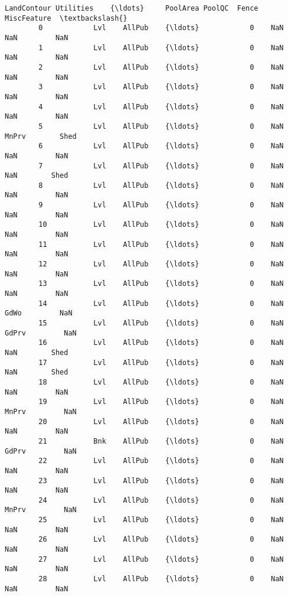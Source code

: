 \documentclass[11pt]{article}
\begin{document}
\begin{Verbatim}[commandchars=\\\{\}]
             LandContour Utilities    {\ldots}     PoolArea PoolQC  Fence MiscFeature  \textbackslash{}
        0            Lvl    AllPub    {\ldots}            0    NaN    NaN         NaN   
        1            Lvl    AllPub    {\ldots}            0    NaN    NaN         NaN   
        2            Lvl    AllPub    {\ldots}            0    NaN    NaN         NaN   
        3            Lvl    AllPub    {\ldots}            0    NaN    NaN         NaN   
        4            Lvl    AllPub    {\ldots}            0    NaN    NaN         NaN   
        5            Lvl    AllPub    {\ldots}            0    NaN  MnPrv        Shed   
        6            Lvl    AllPub    {\ldots}            0    NaN    NaN         NaN   
        7            Lvl    AllPub    {\ldots}            0    NaN    NaN        Shed   
        8            Lvl    AllPub    {\ldots}            0    NaN    NaN         NaN   
        9            Lvl    AllPub    {\ldots}            0    NaN    NaN         NaN   
        10           Lvl    AllPub    {\ldots}            0    NaN    NaN         NaN   
        11           Lvl    AllPub    {\ldots}            0    NaN    NaN         NaN   
        12           Lvl    AllPub    {\ldots}            0    NaN    NaN         NaN   
        13           Lvl    AllPub    {\ldots}            0    NaN    NaN         NaN   
        14           Lvl    AllPub    {\ldots}            0    NaN   GdWo         NaN   
        15           Lvl    AllPub    {\ldots}            0    NaN  GdPrv         NaN   
        16           Lvl    AllPub    {\ldots}            0    NaN    NaN        Shed   
        17           Lvl    AllPub    {\ldots}            0    NaN    NaN        Shed   
        18           Lvl    AllPub    {\ldots}            0    NaN    NaN         NaN   
        19           Lvl    AllPub    {\ldots}            0    NaN  MnPrv         NaN   
        20           Lvl    AllPub    {\ldots}            0    NaN    NaN         NaN   
        21           Bnk    AllPub    {\ldots}            0    NaN  GdPrv         NaN   
        22           Lvl    AllPub    {\ldots}            0    NaN    NaN         NaN   
        23           Lvl    AllPub    {\ldots}            0    NaN    NaN         NaN   
        24           Lvl    AllPub    {\ldots}            0    NaN  MnPrv         NaN   
        25           Lvl    AllPub    {\ldots}            0    NaN    NaN         NaN   
        26           Lvl    AllPub    {\ldots}            0    NaN    NaN         NaN   
        27           Lvl    AllPub    {\ldots}            0    NaN    NaN         NaN   
        28           Lvl    AllPub    {\ldots}            0    NaN    NaN         NaN   

\end{Verbatim}
\end{document}
